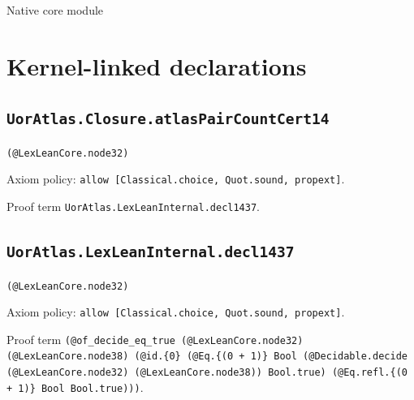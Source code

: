 \documentclass[11pt]{article}
\begin{document}
\begin{center}{\LARGE Native core module}\end{center}
\section*{Kernel-linked declarations}
\subsection*{\texttt{UorAtlas.Closure.atlasPairCountCert14}}
\noindent\texttt{(@LexLeanCore.node32)}\par
\noindent Axiom policy: \texttt{allow [Classical.choice, Quot.sound, propext]}.\par
\noindent Proof term \texttt{UorAtlas.LexLeanInternal.decl1437}.\par
\subsection*{\texttt{UorAtlas.LexLeanInternal.decl1437}}
\noindent\texttt{(@LexLeanCore.node32)}\par
\noindent Axiom policy: \texttt{allow [Classical.choice, Quot.sound, propext]}.\par
\noindent Proof term \texttt{(@of\_decide\_eq\_true (@LexLeanCore.node32) (@LexLeanCore.node38) (@id.\{0\} (@Eq.\{(0 + 1)\} Bool (@Decidable.decide (@LexLeanCore.node32) (@LexLeanCore.node38)) Bool.true) (@Eq.refl.\{(0 + 1)\} Bool Bool.true)))}.\par
\end{document}
